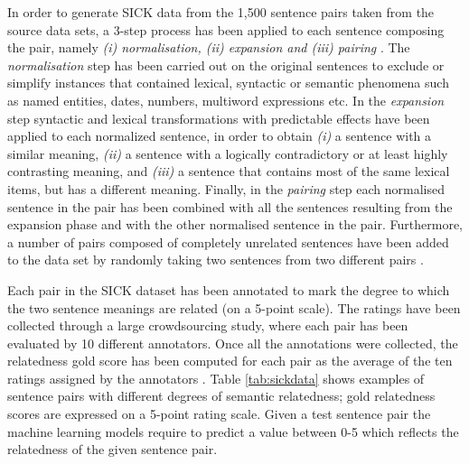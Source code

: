 \begin{enumerate}
  In order to generate SICK data from the 1,500 sentence pairs taken from the source data sets, a 3-step process has been applied to each sentence composing the pair, namely \textit{(i) normalisation, (ii) expansion and (iii) pairing} \cite{marelli-etal-2014-semeval}. The \textit{normalisation} step has been carried out on the original sentences to exclude or simplify instances that contained lexical, syntactic or semantic phenomena such as named entities, dates, numbers, multiword expressions etc. In the \textit{expansion} step syntactic and lexical transformations with predictable effects have been applied to each normalized sentence, in
  order to obtain \textit{(i)} a sentence with a similar meaning, \textit{(ii)} a sentence with a logically contradictory or at least highly contrasting meaning, and \textit{(iii)} a sentence that contains most of the same lexical items, but has a different meaning. Finally, in the \textit{pairing} step each normalised sentence in the pair has been combined with all the sentences resulting from the expansion phase and with the other normalised sentence in the pair. Furthermore, a number of pairs composed of completely unrelated sentences have been added to the data set by randomly taking two sentences from two different pairs \cite{marelli-etal-2014-semeval}. 
  
  Each pair in the SICK dataset has been annotated to mark the degree to which the two sentence meanings are related (on a 5-point scale). The ratings 
  have been collected through a large crowdsourcing study, where each pair 
  has been evaluated by 10 different annotators. Once all the annotations were collected, the relatedness gold score has been computed for each pair as the average of the ten ratings assigned by the annotators \cite{marelli-etal-2014-semeval}. Table \ref{tab:sickdata} shows examples of sentence pairs with different degrees of semantic relatedness; gold relatedness scores are expressed on a 5-point rating scale. Given a test sentence pair the machine learning models require to predict a value between 0-5 which reflects the relatedness of the given sentence pair. 
  

\end{enumerate}

